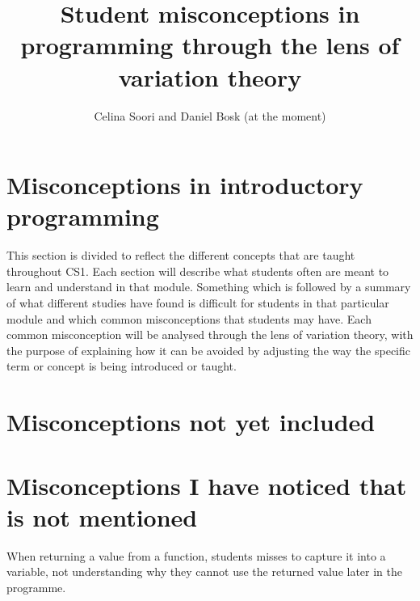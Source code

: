 \documentclass[onecolumn]{article}
\title{Student misconceptions in programming through the lens of variation 
theory}
\author{Celina Soori and Daniel Bosk (at the moment)}
\begin{document}
\maketitle
\newpage
\tableofcontents
\newpage












\section{Misconceptions in introductory programming}
\label{misconceptions}

This section is divided to reflect the different concepts that are taught 
throughout CS1. Each section will describe what students often are meant to 
learn and understand in that module. Something which is followed by a 
summary 
of what different studies have found is difficult for students in that 
particular
module and which common misconceptions that students may have. Each common 
misconception will be analysed through the lens of variation theory, with 
the purpose of explaining how it can be avoided by adjusting the way 
the specific term or concept is being introduced or taught. 










\newpage
\printbibliography

\newpage

\appendix

\section{Misconceptions not yet included}




\section{Misconceptions I have noticed that is not mentioned}

When returning a value from a function, students misses to capture it into 
a variable, not understanding why they cannot use the returned value later 
in the programme. 
\end{document}
